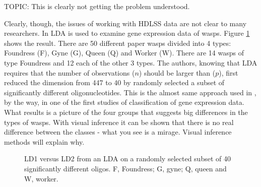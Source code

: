 \documentclass[12]{article}
\newcommand{\blue}{\color{blue}}
\begin{document}
{\blue TOPIC: This is clearly not getting the problem understood.}

Clearly, though, the issues of working with HDLSS data are not clear to many researchers. In \cite{toth:2010} LDA is used to examine gene expression data of wasps. Figure \ref{oligo} shows the result. There are 50 different paper wasps divided into 4 types: Foundress (F), Gyne (G), Queen (Q) and Worker (W). There are 14  wasps of type Foundress and 12 each of the other 3 types. The authors, knowing that LDA requires that the number of observations ($n$) should be larger than ($p$), first reduced the dimension from 447 to 40 by randomly selected a subset of significantly different oligonucleotides. This is the almost same approach used in \cite{dudoit:2002}, by the way, in one of the first studies of classification of gene expression data. What results is a picture of the four groups that suggests big differences in the types of wasps. With visual inference it can be shown that there is no real difference between the classes - what you see is a mirage. Visual inference methods will explain why. 

\begin{figure}[hbtp]
   \centering
       \caption{LD1 versus LD2 from an LDA on a randomly selected subset of 40 significantly different oligos. F, Foundress; G, gyne; Q, queen and W, worker.}
     \label{oligo}
\end{figure}  
\end{document}

